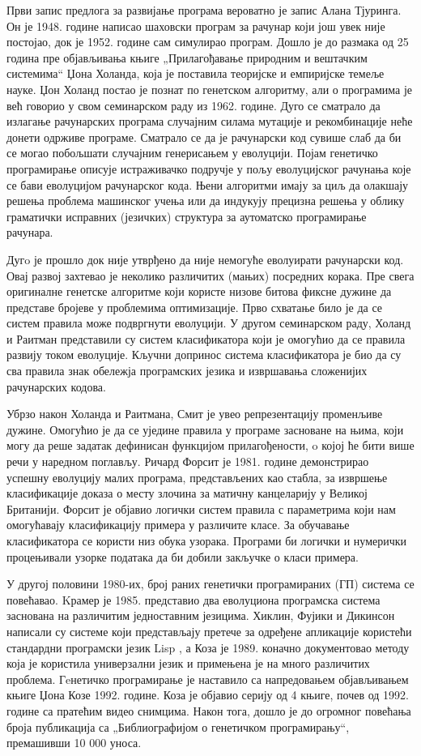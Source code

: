 \documentclass[a4paper]{article}
\begin{document}
Први запис предлога за развијање програма вероватно је запис Алана Тјуринга. Он је 1948. године написао шаховски програм за рачунар који још увек није постојао, док је 1952. године сам симулирао програм. Дошло је до размака од 25 година пре објављивања књиге „Прилагођавање природним и вештачким системима“ Џона Холанда, која је поставила теоријске и емпиријске темеље науке.
Џон Холанд постао је познат по генетском алгоритму, али о програмима је већ говорио у свом семинарском раду из 1962. године. Дуго се сматрало да излагање рачунарских програма
случајним силама мутације и рекомбинације неће донети одрживе програме. Сматрало се да је рачунарски код сувише слаб да би се могао побољшати случајним генерисањем у еволуцији.
Појам генетичко програмирање описује истраживачко подручје у пољу еволуцијског рачунања које се бави еволуцијом рачунарског кода. Њени алгоритми имају за циљ да олакшају решења проблема машинског учења или да индукују прецизна решења у облику граматички исправних (језичких) структура за аутоматско програмирање рачунара.



Дугo је прошло док није утврђено  да није немогуће еволуирати рачунарски код. Овај развој захтевао је неколико различитих (мањих) посредних корака. Пре свега оригиналне генетске алгоритме који користе низове битова фиксне дужине да представе бројеве у проблемима оптимизације. Прво схватање било је да се систем правила може подвргнути еволуцији. У другом семинарском раду, Холанд и Раитман представили су систем класификатора који је омогућио да се правила развију током еволуције. Кључни допринос система класификатора је био да су сва правила знак обележја програмских језика и извршавања сложенијих рачунарских кодова.


Убрзо након Холанда и Раитмана, Смит је увео репрезентацију променљиве дужине.  Омогућио је да се уједине правила у програме засноване на њима, који могу да реше задатак дефинисан функцијом прилагођености, o којој ће бити више речи у наредном поглављу. Ричард Форсит је 1981. године демонстрирао успешну еволуцију малих програма, представљених као стабла, за извршење класификације доказа о месту злочина за матичну канцеларију у Великој Британији. Форсит је објавио логички систем правила с параметрима који нам омогућавају класификацију примера у различите класе. За обучавање класификатора се користи низ обука узорака. Програми би логички и нумерички процењивали узорке података да би добили закључке о класи примера.


У другој половини 1980-их, број раних генетички програмираних (ГП) система се повећавао. Kрамер је 1985. представио два еволуциона програмска система заснована на различитим једноставним језицима. Хиклин, Фујики и Дикинсон написали су системе који представљају претече за одређене апликације користећи стандардни програмски језик Lisp \cite{lisp}, а Коза је 1989. коначно документовао методу која је користила универзални језик и примењена је на много различитих проблема. Гeнетичко програмирање је наставило са напредовањем објављивањем књиге Џона Козе 1992. године. Коза је објавио серију од 4 књиге, почев од 1992. године са пратећим видео снимцима. Након тога, дошло је до огромног повећања броја публикација са „Библиографијом о генетичком програмирању“, премашивши 10 000 уноса.
\end{document}
